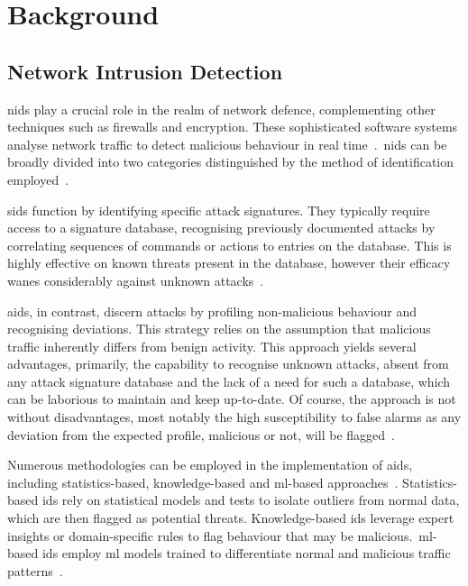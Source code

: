 \chapter{Background}%
\label{chp:background}

\section{Network Intrusion Detection}%
\label{sec:nids}

\gls{nids} play a crucial role in the realm of network defence, complementing
other techniques such as firewalls and encryption. These sophisticated software
systems analyse network traffic to detect malicious behaviour in real
time~\cite{survey2}.\ \gls{nids} can be broadly divided into two categories
distinguished by the method of identification employed~\cite{survey1}.

\gls{sids} function by identifying specific attack signatures. They typically
require access to a signature database, recognising previously documented
attacks by correlating sequences of commands or actions to entries on the
database. This is highly effective on known threats present in the database,
however their efficacy wanes considerably against unknown
attacks~\cite{survey1, survey2}.

\gls{aids}, in contrast, discern attacks by profiling non-malicious behaviour
and recognising deviations. This strategy relies on the assumption that
malicious traffic inherently differs from benign activity. This approach yields
several advantages, primarily, the capability to recognise unknown attacks,
absent from any attack signature database and the lack of a need for such a
database, which can be laborious to maintain and keep up-to-date. Of course,
the approach is not without disadvantages, most notably the high susceptibility
to false alarms as any deviation from the expected profile, malicious or not,
will be flagged~\cite{survey1, survey2}.

Numerous methodologies can be employed in the implementation of \gls{aids},
including statistics-based, knowledge-based and \gls{ml}-based
approaches~\cite{survey1}. Statistics-based \gls{ids} rely on statistical
models and tests to isolate outliers from normal data, which are then flagged
as potential threats. Knowledge-based \gls{ids} leverage expert insights or
domain-specific rules to flag behaviour that may be malicious.\ \gls{ml}-based
\gls{ids} employ \gls{ml} models trained to differentiate normal and malicious
traffic patterns~\cite{survey1}.

